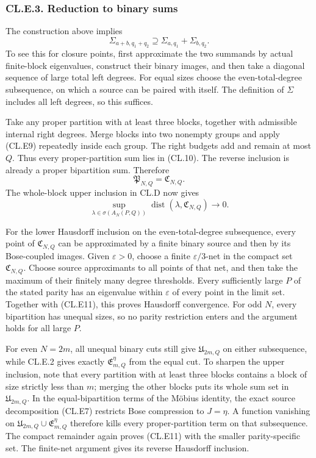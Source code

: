 \documentclass[a4paper,11pt]{article}
\numberwithin{equation}{section}
\begin{document}
\hypertarget{cl.e.3.-reduction-to-binary-sums}{%
\subsubsection{CL.E.3. Reduction to binary sums}\label{cl.e.3.-reduction-to-binary-sums}}

The construction above implies \[
\Sigma_{a+b,q_1+q_2}\supseteq
\Sigma_{a,q_1}+\Sigma_{b,q_2}.
\tag{CL.E9}
\] To see this for closure points, first approximate the two summands by actual finite-block eigenvalues, construct their binary images, and then take a diagonal sequence of large total left degrees. For equal sizes choose the even-total-degree subsequence, on which a source can be paired with itself. The definition of \(\Sigma\) includes all left degrees, so this suffices.

Take any proper partition with at least three blocks, together with admissible internal right degrees. Merge blocks into two nonempty groups and apply (CL.E9) repeatedly inside each group. The right budgets add and remain at most \(Q\). Thus every proper-partition sum lies in (CL.10). The reverse inclusion is already a proper bipartition sum. Therefore \[
\mathfrak P_{N,Q}=\mathfrak C_{N,Q}.
\tag{CL.E10}
\] The whole-block upper inclusion in CL.D now gives \[
\sup_{\lambda\in\sigma(A_N(P,Q))}
\operatorname{dist}(\lambda,\mathfrak C_{N,Q})\longrightarrow0.
\tag{CL.E11}
\]

For the lower Hausdorff inclusion on the even-total-degree subsequence, every point of \(\mathfrak C_{N,Q}\) can be approximated by a finite binary source and then by its Bose-coupled images. Given \(\varepsilon>0\), choose a finite \(\varepsilon/3\)-net in the compact set \(\mathfrak C_{N,Q}\). Choose source approximants to all points of that net, and then take the maximum of their finitely many degree thresholds. Every sufficiently large \(P\) of the stated parity has an eigenvalue within \(\varepsilon\) of every point in the limit set. Together with (CL.E11), this proves Hausdorff convergence. For odd \(N\), every bipartition has unequal sizes, so no parity restriction enters and the argument holds for all large \(P\).

For even \(N=2m\), all unequal binary cuts still give \(\mathfrak U_{2m,Q}\) on either subsequence, while CL.E.2 gives exactly \(\mathfrak E_{m,Q}^{\eta}\) from the equal cut. To sharpen the upper inclusion, note that every partition with at least three blocks contains a block of size strictly less than \(m\); merging the other blocks puts its whole sum set in \(\mathfrak U_{2m,Q}\). In the equal-bipartition terms of the Möbius identity, the exact source decomposition (CL.E7) restricts Bose compression to \(J=\eta\). A function vanishing on \(\mathfrak U_{2m,Q}\cup\mathfrak E_{m,Q}^{\eta}\) therefore kills every proper-partition term on that subsequence. The compact remainder again proves (CL.E11) with the smaller parity-specific set. The finite-net argument gives its reverse Hausdorff inclusion.
\end{document}
